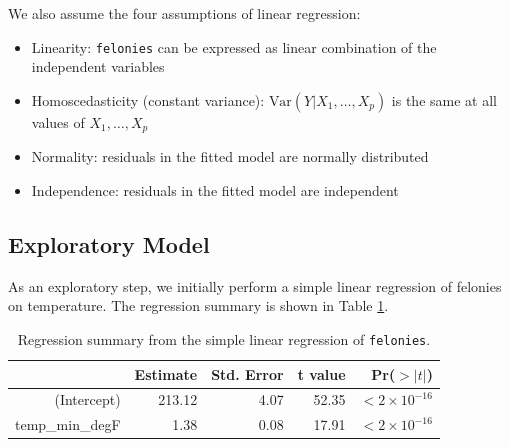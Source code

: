 \documentclass[11pt,notitlepage]{article}
\newenvironment{codeSmall}%
   {\par\noindent\adjustbox{margin=1ex,bgcolor=shadecolor,margin=0ex \medskipamount}\bgroup\minipage\linewidth\verbatim\footnotesize}%
   {\endverbatim\endminipage\egroup}
\begin{document}
We also assume the four assumptions of linear regression:
\begin{itemize}
\setlength\itemsep{-3pt}
\vspace*{-3mm}

\item Linearity: \texttt{felonies} can be expressed as linear combination of the independent variables
\item Homoscedasticity (constant variance): $\text{Var}(Y|X_1,\ldots, X_p)$ is the same at all values of $X_1,\ldots, X_p$
\item Normality: residuals in the fitted model are normally distributed
\item Independence: residuals in the fitted model are independent

\vspace*{-3mm}
\end{itemize}


\subsection{Exploratory Model}
\label{sec:feloniesExploratoryModel}

As an exploratory step, we initially perform a simple linear regression of felonies on temperature. The regression summary is shown in Table \ref{tab:lm1}.



\begin{table}[ht]
\vspace*{-1mm}
\footnotesize
\centering
\begin{tabular}{rrrrr}
  \hline
 & Estimate & Std. Error & t value & Pr($>|t|$) \\ 
  \hline
(Intercept) & 213.12 & 4.07 & 52.35 & $<2 \times 10^{-16}$ \\ 
  temp\_min\_degF & 1.38 & 0.08 & 17.91 & $<2 \times 10^{-16}$ \\ 
   \hline
\end{tabular}
\captionsetup{width=0.9\textwidth}
\vspace*{-2mm}
\caption{Regression summary from the simple linear regression of \texttt{felonies}.}
\label{tab:lm1}   
\vspace*{-3mm}
\end{table}
\end{document}
